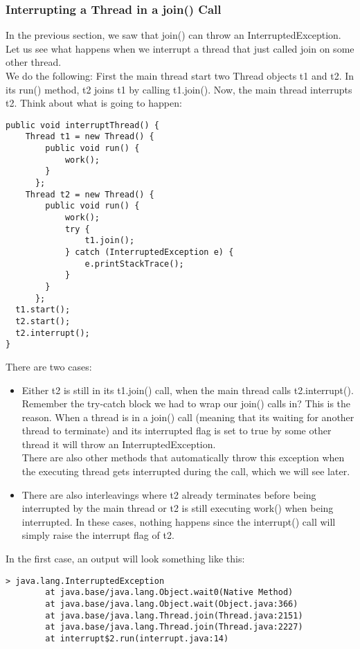 \documentclass[main.tex]{subfiles}
\begin{document}
\subsubsection{Interrupting a Thread in a join() Call}
In the previous section, we saw that join() can throw an InterruptedException. Let us see what happens when we interrupt a thread that just called join on some other thread.\\[3mm]
We do the following: First the main thread start two Thread objects t1 and t2. In its run() method, t2 joins t1 by calling t1.join(). Now, the main thread interrupts t2. Think about what is going to happen:
\begin{verbatim}
public void interruptThread() {
    Thread t1 = new Thread() {
        public void run() {
            work();
        }
      };
    Thread t2 = new Thread() {
        public void run() {
            work();
            try {
                t1.join();
            } catch (InterruptedException e) {
                e.printStackTrace();
            }
        }
      };
  t1.start();
  t2.start();
  t2.interrupt();
}
\end{verbatim}
There are two cases:
\begin{itemize}
  \item Either t2 is still in its t1.join() call, when the main thread calls t2.interrupt(). Remember the try-catch block we had to wrap our join() calls in? This is the reason. When a thread is in a join() call (meaning that its waiting for another thread to terminate) and its interrupted flag is set to true by some other thread it will throw an InterruptedException.\\
  There are also other methods that automatically throw this exception when the executing thread gets interrupted during the call, which we will see later.
  \item There are also interleavings where t2 already terminates before being interrupted by the main thread or t2 is still executing work() when being interrupted. In these cases, nothing happens since the interrupt() call will simply raise the interrupt flag of t2.
\end{itemize}
In the first case, an output will look something like this:
\begin{verbatim}
> java.lang.InterruptedException
        at java.base/java.lang.Object.wait0(Native Method)
        at java.base/java.lang.Object.wait(Object.java:366)
        at java.base/java.lang.Thread.join(Thread.java:2151)
        at java.base/java.lang.Thread.join(Thread.java:2227)
        at interrupt$2.run(interrupt.java:14)
\end{verbatim}
\end{document}
